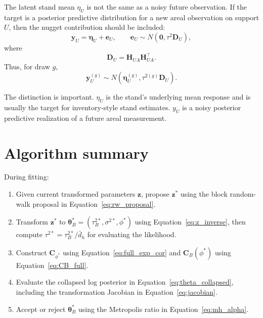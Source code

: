 \documentclass[11pt]{article}
\newcommand{\bstheta}{\bm{\theta}}
\begin{document}
The latent stand mean $\eta_U$ is not the same as a noisy future observation. If the target is a posterior predictive distribution for a new areal observation on support $U$, then the nugget contribution should be included:
\begin{equation}
\bm{y}_U
=
\bm{\eta}_U+\bm{e}_U,
\qquad
\bm{e}_U\sim N(\bm{0},\tau^2\bm{D}_U),
\label{eq:yU_pred}
\end{equation}
where
\begin{equation}
\bm{D}_U
=
\bm{H}_{UA}\bm{H}_{UA}^{\top}.
\label{eq:DU}
\end{equation}
Thus, for draw $g$,
\begin{equation}
\bm{y}_U^{(g)}
\sim
N\left(
\bm{\eta}_U^{(g)},
\tau^{2(g)}\bm{D}_U
\right).
\label{eq:yU_draw}
\end{equation}

The distinction is important. $\eta_U$ is the stand's underlying mean response and is usually the target for inventory-style stand estimates. $y_U$ is a noisy posterior predictive realization of a future areal measurement.

\section{Algorithm summary}

During fitting:
\begin{enumerate}[leftmargin=2em]
\item Given current transformed parameters $\bm{z}$, propose $\bm{z}^{*}$ using the block random-walk proposal in Equation~\eqref{eq:rw_proposal}.
\item Transform $\bm{z}^{*}$ to $\bstheta_B^{*}=(\tau_B^{2*},\sigma^{2*},\phi^{*})$ using Equation~\eqref{eq:z_inverse}, then compute $\tau^{2*}=\tau_B^{2*}/\bar{d}_h$ for evaluating the likelihood.
\item Construct $\bm{C}_{\phi^{*}}$ using Equation~\eqref{eq:full_exp_cor} and $\bm{C}_B(\phi^{*})$ using Equation~\eqref{eq:CB_full}.
\item Evaluate the collapsed log posterior in Equation~\eqref{eq:theta_collapsed}, including the transformation Jacobian in Equation~\eqref{eq:jacobian}.
\item Accept or reject $\bstheta_B^{*}$ using the Metropolis ratio in Equation~\eqref{eq:mh_alpha}.
\end{enumerate}
\end{document}
